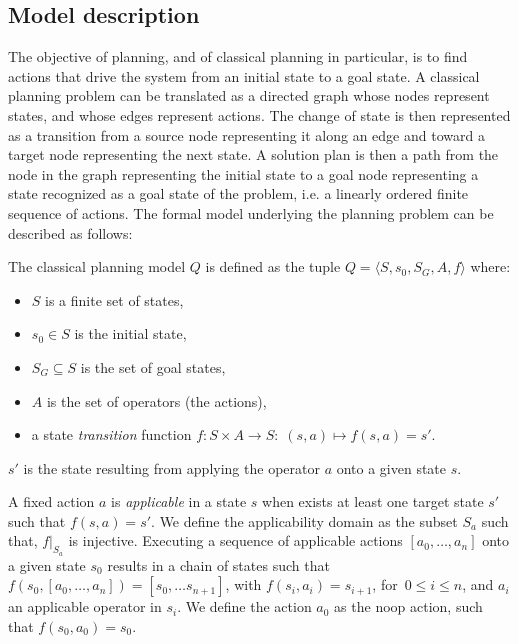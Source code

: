 \subsection{Model description}
The objective of planning, and of classical planning in particular, is
to find actions that drive the system from an initial state to a goal state.
%
A classical planning problem can be translated as a directed graph whose
nodes represent states, and whose edges represent actions.  The change
of state is then represented as a transition from a source node
representing it along an edge and toward a target node representing
the next state.  A solution plan is then a path from the node in the
graph representing the initial state to a goal node representing a
state recognized as a goal state of the problem, i.e. a linearly ordered finite sequence of actions. The formal model
underlying the planning problem can be described as follows:

\begin{definition}\label{def:classical}
 The classical planning model $Q$ is defined as the tuple 
 $Q = \langle S, s_0, S_G, A, f\rangle$ where:
  \begin{itemize}
  \item $S$ is a finite set of states,
  \item $s_0 \in S$ is the initial state,
  \item $S_G \subseteq S$ is the set of goal states,
  \item $A$ is the set of operators (the actions),
  \item a state \emph{transition} function $f: S \times A \to S : \; (s,a) \mapsto f(s,a) = s'$.
  \end{itemize}
 $s'$ is the state resulting from applying the operator $a$ onto a given state $s$.

 A fixed action $a$ is \emph{applicable} in a state $s$ when exists at least one target state $s'$ such that $f(s,a)=s'$. We define the applicability domain as the subset $S_a$ such that, $f\vert_{S_a}$ is injective.
Executing a sequence of applicable actions $[ a_0, \ldots, a_n]$ onto a given state $s_0$ results in a chain of states
such that
$f\left(s_0, \left[a_0, \ldots, a_n \right]\right) = \left[ s_0, \ldots s_{n+1}  \right]$,
with $f (s_i, a_i)= s_{i+1}$, for $\,0 \le i \le n$, and $a_i$ an applicable operator in $s_i$. 
We define the action $a_0$ as the noop action, such that $f(s_0, a_0) = s_0$.
\end{definition}

